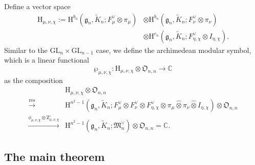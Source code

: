 \documentclass[12pt, a4paper]{amsart}
\newcommand{\RH}{{\mathrm {H}}}
\newcommand{\RZ}{{\mathrm {Z}}}
\newcommand{\GL}{{\mathrm{GL}}}
\newcommand{\C}{\mathbb{C}}
\theoremstyle{Theorem}
\theoremstyle{Theorem}
\theoremstyle{Theorem}
\theoremstyle{Theorem}
\theoremstyle{Plain}
\theoremstyle{Definition}
\begin{document}
	Define a vector space
	\[
	\begin{aligned}
		\RH_{\mu,\nu,\chi}:=\RH^{b_n}\left(\mathfrak{g}_n,\widetilde{K}_n;F_{\mu}^{\vee}\otimes\pi_{\mu}\right)&\otimes\RH^{b_{n}}\left(\mathfrak{g}_{n},\widetilde{K}_{n};F_{\nu}^{\vee}\otimes\pi_{\nu}\right)\\
		&\otimes\RH^{c_n}\left(\mathfrak{g}_{n},\widetilde{K}_{n};F_{\eta,\chi}^{\vee}\otimes I_{\eta,\chi}\right).
	\end{aligned}
	\]
	Similar to the $\GL_n\times\GL_{n-1}$ case, we define the archimedean modular symbol, which is a linear functional
	\begin{equation}
		\label{wpmunuchi}
		\wp_{\mu,\nu,\chi}:\RH_{\mu,\nu,\chi}\otimes\mathfrak{O}_{n,n}\to\C
	\end{equation}
	as the composition
	\[
	\begin{aligned}
		&\RH_{\mu,\nu,\chi}\otimes\mathfrak{O}_{n,n}\\
		\xrightarrow{\mathrm{res}}	& \RH^{n^2-1}\left(\mathfrak{g}_{n},\widetilde{K}_{n};F_{\mu}^{\vee}\otimes F_{\nu}^{\vee}\otimes F_{\eta,\chi}^{\vee}\otimes\pi_{\mu}\widehat{\otimes}\pi_{\nu}\widehat{\otimes}I_{\eta,\chi}\right)\otimes\mathfrak{O}_{n,n}\\
		\xrightarrow{\phi_{\mu,\nu,\chi}\otimes\RZ_{\mu,\nu,\chi}^{\circ}}&\RH^{n^2-1}\left(\mathfrak{g}_{n},\widetilde{K}_{n};\mathfrak{M}_{n}^{\vee}\right)\otimes\mathfrak{O}_{n,n}=\C.
	\end{aligned}
	\]
	
	\subsection{The main theorem}
	
\end{document}
